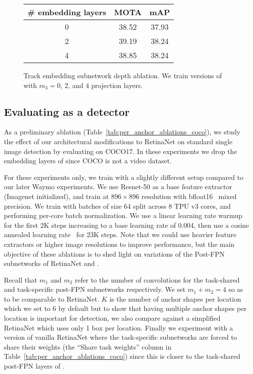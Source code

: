 \vspace{-2mm}
\begin{figure}
    \centering\small
    \begin{tabular}{c|c|c}
        \# embedding layers & MOTA & mAP  \\
        \hline
        0 & 38.52 & 37.93 \\
        2 & 39.19 & 38.24  \\
        4 & 38.85 & 38.24  
    \end{tabular}\vspace{-2mm}
    \caption{\footnotesize  Track embedding subnetwork
    depth ablation. 
    We train versions of \modelname with $m_3=0$, $2$, and $4$ projection layers.}\vspace{-3mm}
    \label{fig:depth_ablation}
\end{figure}




\subsection{Evaluating \modelname as a  detector}
\vspace{-1mm}

As a preliminary ablation (Table~\ref{tab:per_anchor_ablations_coco}), 
we study the effect of our architectural 
modifications to RetinaNet on standard single image detection by 
evaluating on COCO17.  In these experiments we drop the embedding layers
of \modelname since COCO is not a video dataset.

For these experiments only, 
we train with a slightly different setup compared to our later
Waymo experiments.  We use Resnet-50 as a base feature extractor
(Imagenet initialized),
and train at $896\times 896$ resolution with 
bfloat16~\cite{wang2019} mixed precision. 
We train with batches of size 64 split across 8 TPU v3 cores,
and performing per-core batch normalization.
We use a linear learning rate warmup for the first 2K steps increasing to a base learning rate of 0.004, then use a cosine annealed learning rate~\cite{loshchilov2016sgdr} 
for 23K steps.
Note that we could use 
heavier feature extractors or higher image resolutions 
to improve performance, but the main objective of these ablations is to shed
light on variations of the Post-FPN subnetworks of RetinaNet and
\modelname.


Recall that $m_1$ and $m_2$ refer to the number of convolutions 
 for the task-shared and task-specific post-FPN subnetworks
respectively.  
We set $m_1+m_2=4$ so as to be comparable to RetinaNet.  $K$ is the number of anchor
shapes per location which we set to 6 by default but to show that
having multiple anchor shapes per location is important for detection, we also
compare against
a simplified RetinaNet which uses only 1 box per location.
Finally we experiment with a version of vanilla RetinaNet 
where the task-specific subnetworks are forced to share their
weights (the ``Share task weights'' column in Table~\ref{tab:per_anchor_ablations_coco}) since this is
closer to the task-shared post-FPN layers of  \modelname.


